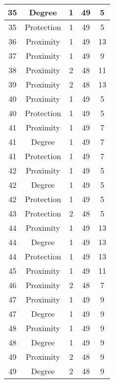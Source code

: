 \documentclass[results.tex]{subfiles}
\begin{document}
\begin{center}
\begin{tabular}{| c || c | c | c | c |}
    \hline
    35 & Degree & 1 & 49 & 5 \\ 
    \hline
    35 & Protection & 1 & 49 & 5 \\ 
    \hline
    36 & Proximity & 1 & 49 & 13 \\ 
    \hline
    37 & Proximity & 1 & 49 & 9 \\ 
    \hline
    38 & Proximity & 2 & 48 & 11 \\ 
    \hline
    39 & Proximity & 2 & 48 & 13 \\ 
    \hline
    40 & Proximity & 1 & 49 & 5 \\ 
    \hline
    40 & Protection & 1 & 49 & 5 \\ 
    \hline
    41 & Proximity & 1 & 49 & 7 \\ 
    \hline
    41 & Degree & 1 & 49 & 7 \\ 
    \hline
    41 & Protection & 1 & 49 & 7 \\ 
    \hline
    42 & Proximity & 1 & 49 & 5 \\ 
    \hline
    42 & Degree & 1 & 49 & 5 \\ 
    \hline
    42 & Protection & 1 & 49 & 5 \\ 
    \hline
    43 & Protection & 2 & 48 & 5 \\ 
    \hline
    44 & Proximity & 1 & 49 & 13 \\ 
    \hline
    44 & Degree & 1 & 49 & 13 \\ 
    \hline
    44 & Protection & 1 & 49 & 13 \\ 
    \hline
    45 & Proximity & 1 & 49 & 11 \\ 
    \hline
    46 & Proximity & 2 & 48 & 7 \\ 
    \hline
    47 & Proximity & 1 & 49 & 9 \\ 
    \hline
    47 & Degree & 1 & 49 & 9 \\ 
    \hline
    48 & Proximity & 1 & 49 & 9 \\ 
    \hline
    48 & Degree & 1 & 49 & 9 \\ 
    \hline
    49 & Proximity & 2 & 48 & 9 \\ 
    \hline
    49 & Degree & 2 & 48 & 9 \\ 
    \hline   \end{tabular}
\end{center}
\end{document}
